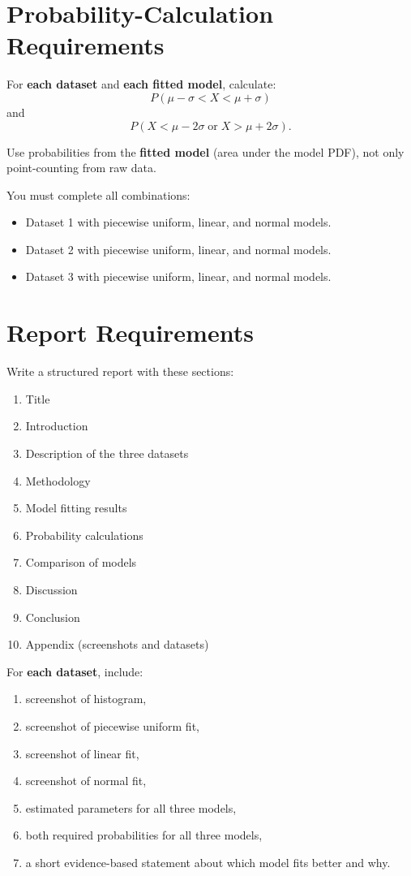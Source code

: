 	\section{Probability-Calculation Requirements}
	For \textbf{each dataset} and \textbf{each fitted model}, calculate:
	\[
	P(\mu-\sigma < X < \mu+\sigma)
	\]
	and
	\[
	P(X<\mu-2\sigma\;\text{or}\;X>\mu+2\sigma).
	\]
	
	Use probabilities from the \textbf{fitted model} (area under the model PDF), not only point-counting from raw data.
	
	You must complete all combinations:
	\begin{itemize}
		\item Dataset 1 with piecewise uniform, linear, and normal models.
		\item Dataset 2 with piecewise uniform, linear, and normal models.
		\item Dataset 3 with piecewise uniform, linear, and normal models.
	\end{itemize}

	\section{Report Requirements}
	Write a structured report with these sections:
	\begin{enumerate}
		\item Title
		\item Introduction
		\item Description of the three datasets
		\item Methodology
		\item Model fitting results
		\item Probability calculations
		\item Comparison of models
		\item Discussion
		\item Conclusion
		\item Appendix (screenshots and datasets)
	\end{enumerate}
	
	For \textbf{each dataset}, include:
	\begin{enumerate}
		\item screenshot of histogram,
		\item screenshot of piecewise uniform fit,
		\item screenshot of linear fit,
		\item screenshot of normal fit,
		\item estimated parameters for all three models,
		\item both required probabilities for all three models,
		\item a short evidence-based statement about which model fits better and why.
	\end{enumerate}

